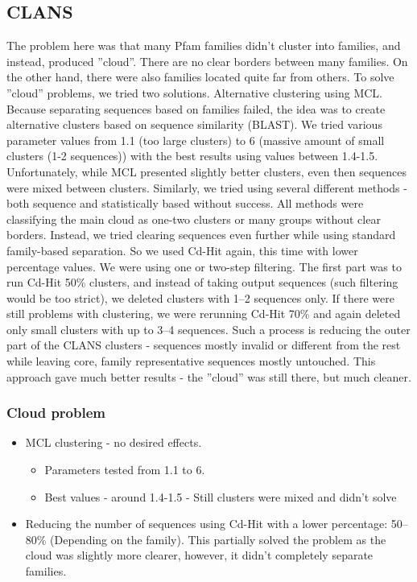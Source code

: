       \subsection{CLANS}
The problem here was that many Pfam families didn't cluster into families, and instead, produced ''cloud''.
There are no clear borders between many families.
On the other hand, there were also families located quite far from others.
To solve ''cloud'' problems, we tried two solutions.
Alternative clustering using MCL\@.
Because separating sequences based on families failed, the idea was to create alternative clusters based on sequence similarity (BLAST).
We tried various parameter values from 1.1 (too large clusters) to 6 (massive amount of small clusters (1-2 sequences)) with the best results using values between 1.4-1.5.
Unfortunately, while MCL presented slightly better clusters, even then sequences were mixed between clusters.
Similarly, we tried using several different methods - both sequence and statistically based without success.
All methods were classifying the main cloud as one-two clusters or many groups without clear borders.
Instead, we tried clearing sequences even further while using standard family-based separation.
So we used Cd-Hit again, this time with lower percentage values.
We were using one or two-step filtering.
The first part was to run Cd-Hit 50\% clusters, and instead of taking output sequences (such filtering would be too strict), we deleted clusters with 1--2 sequences only.
If there were still problems with clustering, we were rerunning Cd-Hit 70\% and again deleted only small clusters with up to 3--4 sequences.
Such a process is reducing the outer part of the CLANS clusters - sequences mostly invalid or different from the rest while leaving core, family representative sequences mostly untouched.
This approach gave much better results - the ''cloud'' was still there, but much cleaner.


        \subsubsection{Cloud problem}
\begin{itemize}
   \item MCL clustering - no desired effects.
   \begin{itemize}
      \item Parameters tested from 1.1 to 6.
      \item Best values - around 1.4-1.5 - Still clusters were mixed and didn't solve
   \end{itemize}
   \item Reducing the number of sequences using Cd-Hit with a lower percentage: 50--80\% (Depending on the family).
      This partially solved the problem as the cloud was slightly more clearer, however, it didn't completely separate families.
\end{itemize}


